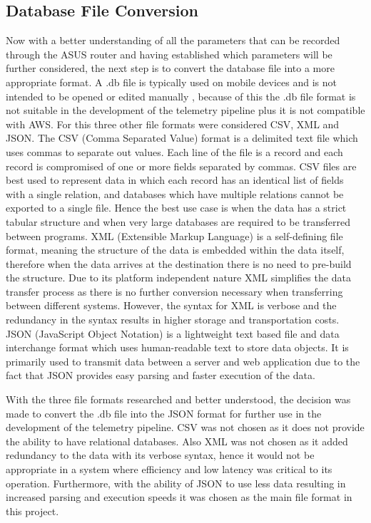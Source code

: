 \subsection{Database File Conversion}
\label{Section: Database File Conversion}

Now with a better understanding of all the parameters that can be recorded through the ASUS router and having established which parameters will be further considered, the next step is to convert the database file into a more appropriate format. A .db file is typically used on mobile devices and is not intended to be opened or edited manually \cite{dbFiles}, because of this the .db file format is not suitable in the development of the telemetry pipeline plus it is not compatible with AWS. For this three other file formats were considered CSV, XML and JSON. The CSV (Comma Separated Value) format is a delimited text file which uses commas to separate out values. Each line of the file is a record and each record is compromised of one or more fields separated by commas. CSV files are best used to represent data in which each record has an identical list of fields with a single relation, and databases which have multiple relations cannot be exported to a single file. Hence the best use case is when the data has a strict tabular structure and when very large databases are required to be transferred between programs. XML (Extensible Markup Language) is a self-defining file format, meaning the structure of the data is embedded within the data itself, therefore when the data arrives at the destination there is no need to pre-build the structure. Due to its platform independent nature XML simplifies the data transfer process as there is no further conversion necessary when transferring between different systems. However, the syntax for XML is verbose and the redundancy in the syntax results in higher storage and transportation costs. JSON (JavaScript Object Notation) is a lightweight text based file and data interchange format which uses human-readable text to store data objects. It is primarily used to transmit data between a server and web application due to the fact that JSON provides easy parsing and faster execution of the data. 

With the three file formats researched and better understood, the decision was made to convert the .db file into the JSON format for further use in the development of the telemetry pipeline. CSV was not chosen as it does not provide the ability to have relational databases. Also XML was not chosen as it added redundancy to the data with its verbose syntax, hence it would not be appropriate in a system where efficiency and low latency was critical to its operation. Furthermore, with the ability of JSON to use less data resulting in increased parsing and execution speeds it was chosen as the main file format in this project. 


